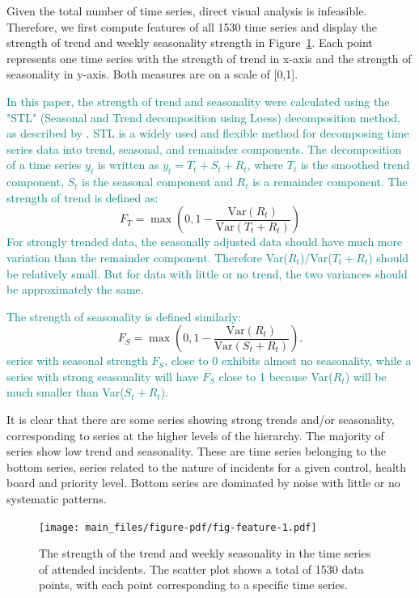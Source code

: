 \documentclass[
  authoryear,
  preprint,
  3p]{elsarticle}
\begin{document}
Given the total number of time series, direct visual analysis is
infeasible. Therefore, we first compute features of all 1530 time series
\citep{m3pca} and display the strength of trend and weekly seasonality
strength in Figure~\ref{fig-feature}. Each point represents one time
series with the strength of trend in x-axis and the strength of
seasonality in y-axis. Both measures are on a scale of {[}0,1{]}.

\textcolor{teal}{In this paper, the strength of trend and seasonality were calculated using the "STL" (Seasonal and Trend decomposition using Loess) decomposition method, as described by}
\citet{kang2017visualising}.
\textcolor{teal}{STL is a widely used and flexible method for decomposing time series data into trend, seasonal, and remainder components. The decomposition of a time series  $y_t$ is written as $y_t = T_t + S_{t} + R_t$, where $T_t$ is the smoothed trend component, $S_t$ is the seasonal component and $R_t$ is a remainder component. The strength of trend is defined as:}
\[F_T = \max\left(0, 1 - \frac{\text{Var}(R_t)}{\text{Var}(T_t+R_t)}\right)\]
\textcolor{teal}{For strongly trended data, the seasonally adjusted data should have much more variation than the remainder component. Therefore Var($R_t$)/Var($T_t+R_t$) should be relatively small. But for data with little or no trend, the two variances should be approximately the same.}

\textcolor{teal}{The strength of seasonality is defined similarly:}
\[F_S = \max\left(0, 1 - \frac{\text{Var}(R_t)}{\text{Var}(S_{t}+R_t)}\right).\]
\textcolor{teal}{series with seasonal strength  $F_S$, close to 0 exhibits almost no seasonality, while a series with strong seasonality will have $F_S$ close to 1 because Var($R_t$) will be much smaller than Var($S_t+R_t$).}

It is clear that there are some series showing strong trends and/or
seasonality, corresponding to series at the higher levels of the
hierarchy. The majority of series show low trend and seasonality. These
are time series belonging to the bottom series, series related to the
nature of incidents for a given control, health board and priority
level. Bottom series are dominated by noise with little or no systematic
patterns.

\begin{figure}

{\centering \texttt{[image: main\_files/figure-pdf/fig-feature-1.pdf]}

}

\caption{\label{fig-feature}The strength of the trend and weekly
seasonality in the time series of attended incidents. The scatter plot
shows a total of 1530 data points, with each point corresponding to a
specific time series.}

\end{figure}
\end{document}

